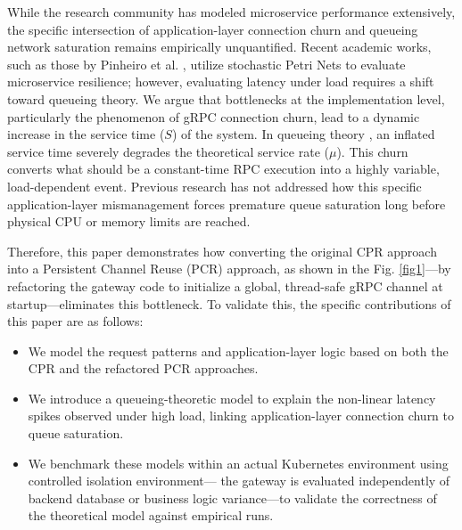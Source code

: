 \documentclass{ieeeaccess}
\begin{document}
While the research community has modeled microservice performance extensively, the specific intersection of application-layer connection churn and queueing network saturation remains empirically unquantified. Recent academic works, such as those by Pinheiro et al. \cite{pinheiro2024performance}, utilize stochastic Petri Nets to evaluate microservice resilience; however, evaluating latency under load requires a shift toward queueing theory. We argue that bottlenecks at the implementation level, particularly the phenomenon of gRPC connection churn, lead to a dynamic increase in the service time ($S$) of the system. In queueing theory \cite{DAuria2021AnMQA}, an inflated service time severely degrades the theoretical service rate ($\mu$). This churn converts what should be a constant-time RPC execution into a highly variable, load-dependent event. Previous research has not addressed how this specific application-layer mismanagement forces premature queue saturation long before physical CPU or memory limits are reached.

Therefore, this paper demonstrates how converting the original CPR approach into a Persistent Channel Reuse (PCR) approach, as shown in the Fig. \ref{fig1}—by refactoring the gateway code to initialize a global, thread-safe gRPC channel at startup—eliminates this bottleneck. To validate this, the specific contributions of this paper are as follows:

\begin{itemize}
    \item We model the request patterns and application-layer logic based on both the CPR and the refactored PCR approaches.
    
    \item We introduce a queueing-theoretic model to explain the non-linear latency spikes observed under high load, linking application-layer connection churn to queue saturation.
    
    \item We benchmark these models within an actual Kubernetes environment using controlled isolation environment— the gateway is evaluated independently of backend database or business logic variance—to validate the correctness of the theoretical model against empirical runs.
\end{itemize}
\end{document}
